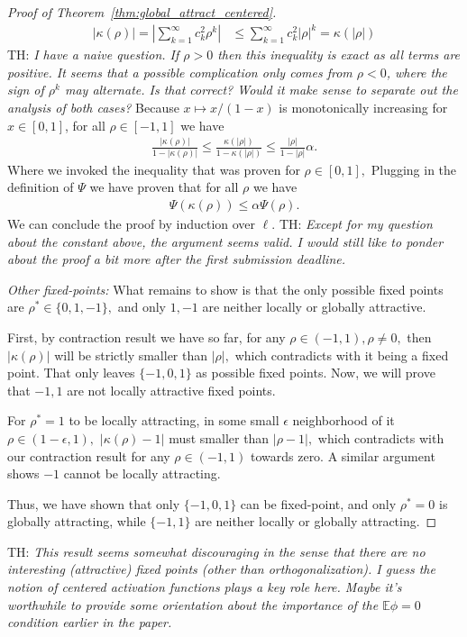 \documentclass[twoside]{article}
\newcommand{\E}{\mathbb{E}}
\theoremstyle{definition}
\newcommand{\thomas}[1]{{\color{blue}TH:  \textit{#1}}}
\begin{document}
\begin{proof}[Proof of Theorem~\ref{thm:global_attract_centered}]
\begin{align*}
 |\kappa(\rho)|=|\sum_{k=1}^\infty c_k^2 \rho^k | &\le \sum_{k=1}^\infty c_k^2 |\rho|^k 
 = \kappa(|\rho|)
\end{align*}
\thomas{I have a naive question. If $\rho > 0$ then this inequality is exact as all terms are positive. It seems that a possible complication only comes from $\rho<0$, where the sign of $\rho^k$ may alternate. Is that correct? Would it make sense to separate out the analysis of both cases?}
 Because $x\mapsto x/(1-x)$ is monotonically increasing for $x\in[0,1]$, for all $\rho\in[-1,1]$ we have 
    \begin{align*}
 \frac{|\kappa(\rho)|}{1-|\kappa(\rho)|}\le \frac{\kappa(|\rho|)}{1-\kappa(|\rho|)} \le \frac{|\rho|}{1-|\rho|}\alpha.
    \end{align*}
Where we invoked the inequality that was proven for $\rho\in[0,1], $ Plugging in the definition of $\Psi$ we have proven that for all $\rho$ we have
\begin{align*}
    \Psi(\kappa(\rho)) \le \alpha \Psi(\rho).
\end{align*}
We can conclude the proof by induction over $\ell.$
\thomas{Except for my question about the constant above, the argument seems valid. I would still like to ponder about the proof a bit more after the first submission deadline.}

\textit{Other fixed-points:}
What remains to show is that the only possible fixed points are $\rho^* \in \{0,1,-1\},$ and only $1,-1$ are neither locally or globally attractive.  

First, by contraction result we have so far, for any $\rho \in (-1,1),\rho\neq 0,$ then $|\kappa(\rho)|$ will be strictly smaller than $|\rho|,$ which contradicts with it being a fixed point. That only leaves $\{-1,0,1\}$ as possible fixed points. Now, we will prove that $-1,1$ are not locally attractive fixed points. 

For $\rho^*=1$ to be locally attracting, in some small $\epsilon$ neighborhood of it $\rho\in(1-\epsilon,1),$ $|\kappa(\rho)-1|$ must smaller than $|\rho-1|,$ which contradicts with our contraction result for any $\rho \in (-1,1)$ towards zero. A similar argument shows $-1$ cannot be locally attracting. 

Thus, we have shown that only $\{-1,0,1\}$ can be fixed-point, and only $\rho^*=0$ is globally attracting, while $\{-1,1\}$ are neither locally or globally attracting. 
\end{proof}
\thomas{This result seems somewhat discouraging in the sense that there are no interesting (attractive) fixed points (other than orthogonalization). I guess the notion of centered activation functions plays a key role here. Maybe it's worthwhile to provide some orientation about the importance of the $\E\phi=0$ condition earlier in the paper.}
\end{document}
